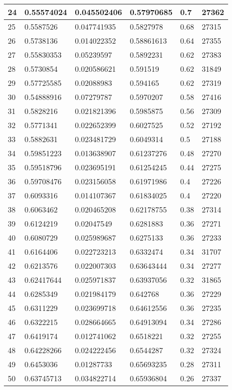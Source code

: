 \begin{longtable}{|l|l|l|l|l|l|}
24 & 0.55574024 & 0.045502406 & 0.57970685 & 0.7 & 27362 \\ \hline 
25 & 0.5587526 & 0.047741935 & 0.5827978 & 0.68 & 27315 \\ \hline 
26 & 0.5738136 & 0.014022352 & 0.58861613 & 0.64 & 27355 \\ \hline 
27 & 0.55830353 & 0.05239597 & 0.5892231 & 0.62 & 27383 \\ \hline 
28 & 0.5730854 & 0.020586621 & 0.591519 & 0.62 & 31849 \\ \hline 
29 & 0.57725585 & 0.02088983 & 0.594165 & 0.62 & 27319 \\ \hline 
30 & 0.54888916 & 0.07279787 & 0.5970207 & 0.58 & 27416 \\ \hline 
31 & 0.5828216 & 0.021821396 & 0.5985875 & 0.56 & 27309 \\ \hline 
32 & 0.5771341 & 0.022652399 & 0.6027525 & 0.52 & 27192 \\ \hline 
33 & 0.5882631 & 0.023481729 & 0.6049314 & 0.5 & 27188 \\ \hline 
34 & 0.59851223 & 0.013638907 & 0.61237276 & 0.48 & 27270 \\ \hline 
35 & 0.59518796 & 0.023695191 & 0.61254245 & 0.44 & 27275 \\ \hline 
36 & 0.59708476 & 0.023156058 & 0.61971986 & 0.4 & 27226 \\ \hline 
37 & 0.6093316 & 0.014107367 & 0.61834025 & 0.4 & 27220 \\ \hline 
38 & 0.6063462 & 0.020465208 & 0.62178755 & 0.38 & 27314 \\ \hline 
39 & 0.6124219 & 0.02047549 & 0.6281883 & 0.36 & 27271 \\ \hline 
40 & 0.6080729 & 0.025989687 & 0.6275133 & 0.36 & 27233 \\ \hline 
41 & 0.6164406 & 0.022723213 & 0.6332474 & 0.34 & 31707 \\ \hline 
42 & 0.6213576 & 0.022007303 & 0.63643444 & 0.34 & 27277 \\ \hline 
43 & 0.62417644 & 0.025971837 & 0.63937056 & 0.32 & 31865 \\ \hline 
44 & 0.6285349 & 0.021984179 & 0.642768 & 0.36 & 27229 \\ \hline 
45 & 0.6311229 & 0.023699718 & 0.64612556 & 0.36 & 27235 \\ \hline 
46 & 0.6322215 & 0.028664665 & 0.64913094 & 0.34 & 27286 \\ \hline 
47 & 0.6419174 & 0.012741062 & 0.6518221 & 0.32 & 27255 \\ \hline 
48 & 0.64228266 & 0.024222456 & 0.6544287 & 0.32 & 27324 \\ \hline 
49 & 0.6453036 & 0.01287733 & 0.65693235 & 0.28 & 27311 \\ \hline 
50 & 0.63745713 & 0.034822714 & 0.65936804 & 0.26 & 27337 \\ \hline 
\end{longtable}
